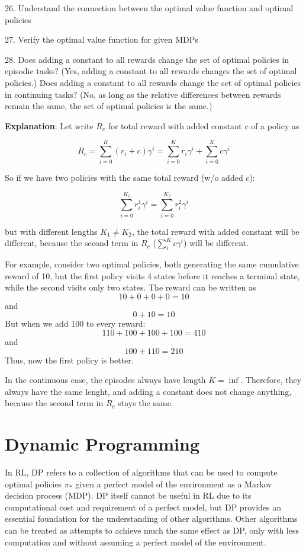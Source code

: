 \documentclass[lang=en,mode=geye,device=normal,color=blue,14pt]{elegantnote}
\DeclareMathOperator*{\1}{\mathbbm{1}}
\begin{document}
26. Understand the connection between the optimal value function and optimal policies

27. Verify the optimal value function for given MDPs

28. Does adding a constant to all rewards change the set of optimal policies in episodic tasks? (Yes, adding a constant to all rewards changes the set of optimal policies.)
Does adding a constant to all rewards change the set of optimal policies in continuing tasks? (No, as long as the relative differences between rewards remain the same, the set of optimal policies is the same.)

\textbf{Explanation}: Let write $R_c$ for total reward with added constant $c$ of a policy as

$$ R_c = \sum_{i=0}^K (r_i + c) \gamma^i = \sum_{i=0}^K r_i \gamma^i + \sum_{i=0}^K c \gamma^i $$

So if we have two policies with the same total reward (w/o added $c$):

$$ \sum_{i=0}^{K_1} r_i^1\gamma^i = \sum_{i=0}^{K_2} r_i^2 \gamma^i $$

but with different lengths $K_1 \neq K_2$, the total reward with added constant will be different, because the second term in $R_c$ ($\sum_i^K c\gamma^i$) will be different.

For example, consider two optimal policies, both generating the same cumulative reward of 10, but the first policy visits 4 states before it reaches a terminal state, while the second visits only two states. The reward can be written as
$$ 10 + 0 + 0 + 0 = 10 $$
and
$$0+10=10$$
But when we add 100 to every reward:
$$ 110+100+100+100=410$$
and
$$100+110=210$$
Thus, now the first policy is better.

In the continuous case, the episodes always have length $K=\inf$. Therefore, they always have the same lenght, and adding a constant does not change anything, because the second term in $R_c$ stays the same.


\newpage
\section{Dynamic Programming}

In RL, DP refers to a collection of algorithms that can be used to compute optimal policies $\pi_*$ given a perfect model of the environment as a Markov decision process (MDP).
DP itself cannot be useful in RL due to its computational cost and requirement of a perfect model, but DP provides an essential foundation for the understanding of other algorithms.
Other algorithms can be treated as attempts to achieve much the same effect as DP, only with less computation and without assuming a perfect model of the environment.
\end{document}
